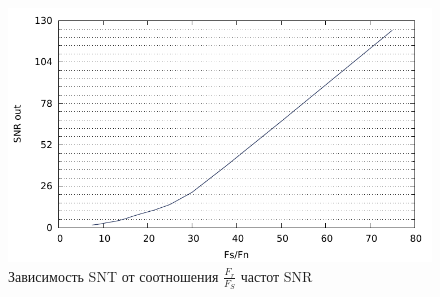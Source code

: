 \documentclass[12pt, a4paper] {ncc}
\begin{document}
        \begin{figure}[H]
            \centering
            \includegraphics[scale=0.9,page=1]{snr_freq.pdf}
            \caption{Зависимость SNT от соотношения $\frac {F_r} {F_S}$ частот SNR}
        \end{figure}
\end{document}

